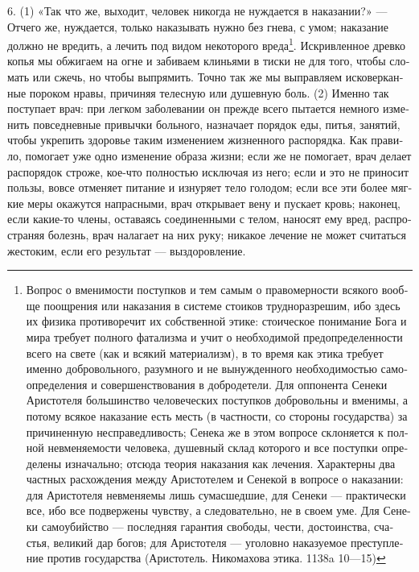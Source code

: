 6. (1) «Так что же, выхо­дит, чело­век нико­гда не нуж­да­ет­ся в нака­за­нии?» --- Отче­го же, нуж­да­ет­ся, толь­ко нака­зы­вать нуж­но без гне­ва, с умом; нака­за­ние долж­но не вредить, а лечить под видом неко­то­ро­го вреда\footnote{Вопрос о вме­ни­мо­сти поступ­ков и тем самым о пра­во­мер­но­сти вся­ко­го вооб­ще поощ­ре­ния или нака­за­ния в систе­ме сто­и­ков труд­но­раз­ре­шим, ибо здесь их физи­ка про­ти­во­ре­чит их соб­ст­вен­ной эти­ке: стои­че­ское пони­ма­ние Бога и мира тре­бу­ет пол­но­го фата­лиз­ма и учит о необ­хо­ди­мой пред­опре­де­лен­но­сти все­го на све­те (как и вся­кий мате­ри­а­лизм), в то вре­мя как эти­ка тре­бу­ет имен­но доб­ро­воль­но­го, разум­но­го и не вынуж­ден­но­го необ­хо­ди­мо­стью само­опре­де­ле­ния и совер­шен­ст­во­ва­ния в доб­ро­де­те­ли. Для оппо­нен­та Сене­ки Ари­сто­те­ля боль­шин­ство чело­ве­че­ских поступ­ков доб­ро­воль­ны и вме­ни­мы, а пото­му вся­кое нака­за­ние есть месть (в част­но­сти, со сто­ро­ны государ­ства) за при­чи­нен­ную неспра­вед­ли­вость; Сене­ка же в этом вопро­се скло­ня­ет­ся к пол­ной невме­ня­е­мо­сти чело­ве­ка, душев­ный склад кото­ро­го и все поступ­ки опре­де­ле­ны изна­чаль­но; отсюда тео­рия нака­за­ния как лече­ния. Харак­тер­ны два част­ных рас­хож­де­ния меж­ду Ари­сто­те­лем и Сене­кой в вопро­се о нака­за­нии: для Ари­сто­те­ля невме­ня­е­мы лишь сума­сшед­шие, для Сене­ки --- прак­ти­че­ски все, ибо все под­вер­же­ны чув­ству, а сле­до­ва­тель­но, не в сво­ем уме. Для Сене­ки само­убий­ство --- послед­няя гаран­тия сво­бо­ды, чести, досто­ин­ства, сча­стья, вели­кий дар богов; для Ари­сто­те­ля --- уго­лов­но нака­зу­е­мое пре­ступ­ле­ние про­тив государ­ства (Ари­сто­тель. Нико­ма­хо­ва эти­ка. 1138a 10—15)}. Искрив­лен­ное древ­ко копья мы обжи­га­ем на огне и заби­ва­ем кли­нья­ми в тис­ки не для того, чтобы сло­мать или сжечь, но чтобы выпря­мить. Точ­но так же мы выправ­ля­ем иско­вер­кан­ные поро­ком нра­вы, при­чи­няя телес­ную или душев­ную боль. (2) Имен­но так посту­па­ет врач: при лег­ком заболе­ва­нии он преж­де все­го пыта­ет­ся немно­го изме­нить повсе­днев­ные при­выч­ки боль­но­го, назна­ча­ет порядок еды, питья, заня­тий, чтобы укре­пить здо­ро­вье таким изме­не­ни­ем жиз­нен­но­го рас­по­ряд­ка. Как пра­ви­ло, помо­га­ет уже одно изме­не­ние обра­за жиз­ни; если же не помо­га­ет, врач дела­ет рас­по­рядок стро­же, кое-что пол­но­стью исклю­чая из него; если и это не при­но­сит поль­зы, вовсе отме­ня­ет пита­ние и изну­ря­ет тело голо­дом; если все эти более мяг­кие меры ока­жут­ся напрас­ны­ми, врач откры­ва­ет вену и пус­ка­ет кровь; нако­нец, если какие-то чле­ны, оста­ва­ясь соеди­нен­ны­ми с телом, нано­сят ему вред, рас­про­стра­няя болезнь, врач нала­га­ет на них руку; ника­кое лече­ние не может счи­тать­ся жесто­ким, если его резуль­тат --- выздо­ров­ле­ние.

